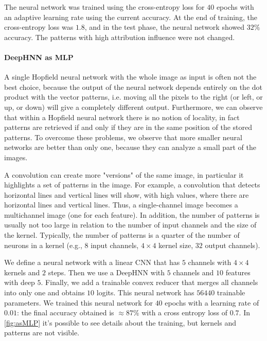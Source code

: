\noindent The neural network was trained using the cross-entropy loss for $40$ epochs with an adaptive learning rate using the current accuracy. At the end of training, the cross-entropy loss was $1.8$, and in the test phase, the neural network showed $32\%$ accuracy. The patterns with high attribution influence were not changed.

\paragraph{DeepHNN as MLP}
A single Hopfield neural network with the whole image as input is often not the best choice, because the output of the neural network depends entirely on the dot product with the vector patterns, i.e. moving all the pixels to the right (or left, or up, or down) will give a completely different output. Furthermore, we can observe that within a Hopfield neural network there is no notion of locality, in fact patterns are retrieved if and only if they are in the same position of the stored patterns. To overcome these problems, we observe that more smaller neural networks are better than only one, because they can analyze a small part of the images.

\noindent A convolution can create more "versions" of the same image, in particular it highlights a set of patterns in the image. For example, a convolution that detects horizontal lines and vertical lines will show, with high values, where there are horizontal lines and vertical lines. Thus, a single-channel image becomes a multichannel image (one for each feature). In addition, the number of patterns is usually not too large in relation to the number of input channels and the size of the kernel. Typically, the number of patterns is a quarter of the number of neurons in a kernel (e.g., $8$ input channels, $4\times4$ kernel size, $32$ output channels).

\noindent We define a neural network with a linear CNN that has $5$ channels with $4\times4$ kernels and $2$ steps. Then we use a DeepHNN with $5$ channels and $10$ features with deep $5$. Finally, we add a trainable convex reducer that merges all channels into only one and obtains $10$ logits. This neural network has $\num{56440}$ trainable parameters. We trained this neural network for $40$ epochs with a learning rate of $0.01$: the final accuracy obtained is $\approx87\%$ with a cross entropy loss of $0.7$. In \cref{fig:asMLP} it's possible to see details about the training, but kernels and patterns are not visible.

